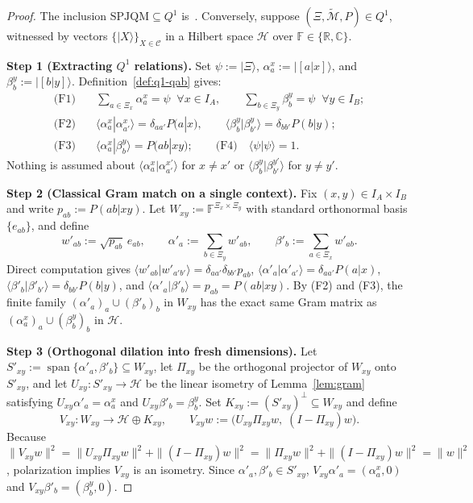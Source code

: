 \documentclass[11pt,a4paper]{article}
\theoremstyle{definition}
\theoremstyle{remark}
\newcommand{\HH}{\mathcal{H}}
\newcommand{\tcM}{\widetilde{\mathcal{M}}}
\newcommand{\cC}{\mathcal{C}}
\newcommand{\SPJQM}{\mathrm{SPJQM}}
\newcommand{\Qone}{Q^{1}}
\newcommand{\ket}[1]{|#1\rangle}
\newcommand{\braket}[2]{\langle #1 | #2 \rangle}
\newcommand{\norm}[1]{\|#1\|}
\newcommand{\F}{\mathbb{F}}
\begin{document}
\begin{proof}
The inclusion $\SPJQM \subseteq \Qone$ is~\cite[Thm.~15]{DHW2014}. Conversely, suppose $(\Xi, \tcM, P) \in \Qone$, witnessed by vectors $\{\ket{X}\}_{X \in \cC}$ in a Hilbert space $\HH$ over $\F \in \{\mathbb{R}, \mathbb{C}\}$.

\medskip\noindent\textbf{Step 1 (Extracting $\Qone$ relations).} Set $\psi := \ket{\Xi}$, $\alpha^x_a := \ket{[a|x]}$, and $\beta^y_b := \ket{[b|y]}$. Definition~\ref{def:q1-qab} gives:
\begin{align*}
\text{(F1)}\quad & \sum_{a \in \Xi_x} \alpha^x_a = \psi \;\;\forall x \in I_A, \qquad \sum_{b \in \Xi_y} \beta^y_b = \psi \;\;\forall y \in I_B; \\
\text{(F2)}\quad & \braket{\alpha^x_a}{\alpha^x_{a'}} = \delta_{aa'} P(a|x), \qquad \braket{\beta^y_b}{\beta^y_{b'}} = \delta_{bb'} P(b|y); \\
\text{(F3)}\quad & \braket{\alpha^x_a}{\beta^y_b} = P(ab|xy); \qquad \text{(F4)}\quad \braket{\psi}{\psi} = 1.
\end{align*}
Nothing is assumed about $\braket{\alpha^x_a}{\alpha^{x'}_{a'}}$ for $x \neq x'$ or $\braket{\beta^y_b}{\beta^{y'}_{b'}}$ for $y \neq y'$.

\medskip\noindent\textbf{Step 2 (Classical Gram match on a single context).} Fix $(x, y) \in I_A \times I_B$ and write $p_{ab} := P(ab|xy)$. Let $W_{xy} := \F^{\Xi_x \times \Xi_y}$ with standard orthonormal basis $\{e_{ab}\}$, and define
\[
w'_{ab} := \sqrt{p_{ab}}\,e_{ab}, \qquad \alpha'_a := \sum_{b \in \Xi_y} w'_{ab}, \qquad \beta'_b := \sum_{a \in \Xi_x} w'_{ab}.
\]
Direct computation gives $\braket{w'_{ab}}{w'_{a'b'}} = \delta_{aa'}\delta_{bb'} p_{ab}$, $\braket{\alpha'_a}{\alpha'_{a'}} = \delta_{aa'} P(a|x)$, $\braket{\beta'_b}{\beta'_{b'}} = \delta_{bb'} P(b|y)$, and $\braket{\alpha'_a}{\beta'_b} = p_{ab} = P(ab|xy)$. By (F2) and (F3), the finite family $(\alpha'_a)_a \cup (\beta'_b)_b$ in $W_{xy}$ has the exact same Gram matrix as $(\alpha^x_a)_a \cup (\beta^y_b)_b$ in $\HH$.

\medskip\noindent\textbf{Step 3 (Orthogonal dilation into fresh dimensions).} Let $S'_{xy} := \operatorname{span}\{\alpha'_a, \beta'_b\} \subseteq W_{xy}$, let $\Pi_{xy}$ be the orthogonal projector of $W_{xy}$ onto $S'_{xy}$, and let $U_{xy} : S'_{xy} \to \HH$ be the linear isometry of Lemma~\ref{lem:gram} satisfying $U_{xy}\alpha'_a = \alpha^x_a$ and $U_{xy}\beta'_b = \beta^y_b$. Set $K_{xy} := (S'_{xy})^\perp \subseteq W_{xy}$ and define
\[
V_{xy} : W_{xy} \longrightarrow \HH \oplus K_{xy}, \qquad V_{xy} w := \bigl(U_{xy}\Pi_{xy} w,\; (I - \Pi_{xy}) w\bigr).
\]
Because $\norm{V_{xy} w}^2 = \norm{U_{xy}\Pi_{xy} w}^2 + \norm{(I-\Pi_{xy}) w}^2 = \norm{\Pi_{xy} w}^2 + \norm{(I-\Pi_{xy}) w}^2 = \norm{w}^2$, polarization implies $V_{xy}$ is an isometry. Since $\alpha'_a, \beta'_b \in S'_{xy}$, $V_{xy}\alpha'_a = (\alpha^x_a, 0)$ and $V_{xy}\beta'_b = (\beta^y_b, 0)$.


\end{proof}
\end{document}
